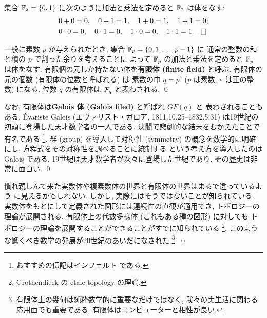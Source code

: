 \documentclass[12pt,twoside]{jarticle}
\begin{document}

\begin{question}[二元体]
  集合 ${\mathbb F}_2=\{0,1\}$ に次のように加法と乗法を定めると ${\mathbb F}_2$ は体をなす:
  \begin{align*}
    &
    0+0=0, \quad 0+1=1, \quad 1+0=1, \quad 1+1=0; 
    \\ &
    0\cdot0=0, \quad 0\cdot1=0, \quad 1\cdot0=0, \quad 1\cdot1=1.
    \qed
  \end{align*}
\end{question}

\begin{guide}[有限体]
  一般に素数 $p$ が与えられたとき, 集合 ${\mathbb F}_p=\{0,1,\ldots,p-1\}$ に
  通常の整数の和と積の $p$ で割った余りを考えることに
  よって ${\mathbb F}_p$ の加法と乗法を定めると ${\mathbb F}_p$ は体をなす.
  有限個の元しか持たない体を{\bf 有限体 (finite field)} と呼ぶ.
  有限体の元の個数 (有限体の位数と呼ばれる) は
  素数の巾 $q=p^e$ ($p$ は素数, $e$ は正の整数) になる.
  位数 $q$ の有限体は ${\mathcal F}_q$ と表わされる.
  \qed
\end{guide}

\begin{guide}[ガロア]
  なお, 有限体は{\bf Galois 体 (Galois filed)} と呼ばれ $GF(q)$ と
  表わされることもある. \'Evariste Galois (エヴァリスト・ガロア,
  1811.10.25--1832.5.31) は19世紀の初頭に登場した天才数学者の一人である.
  決闘で悲劇的な結末をむかえたことで有名である%
  \footnote{おすすめの伝記はインフェルト \cite{Infeld} である.}.
  群 (group) を導入して対称性 (symmetry) の概念を数学的に明確にし, 
  方程式をその対称性を調べることに統制する
  という考え方を導入したのは Galois である.
  19世紀は天才数学者が次々に登場した世紀であり, その歴史は非常に面白い.
  \qed
\end{guide}

\begin{guide}[有限体上の幾何]
  慣れ親しんで来た実数体や複素数体の世界と有限体の世界はまるで違っているよう
  に見えるかもしれない.  しかし, 実際にはそうではないことが知られている.
  実数体をもとにして定義された図形には連続性の直観が適用でき, 
  トポロジーの理論が展開される. 
  有限体上の代数多様体 (これもある種の図形) に対しても
  トポロジーの理論を展開することができることがすでに知られている%
  \footnote{Grothendieck の etale topology の理論.}.
  このような驚くべき数学の発展が20世紀のあいだになされた%
  \footnote{有限体上の幾何は純粋数学的に重要なだけではなく,
    我々の実生活に関わる応用面でも重要である.
    有限体はコンピューターと相性が良い.}.
  \qed
\end{guide}
\end{document}
